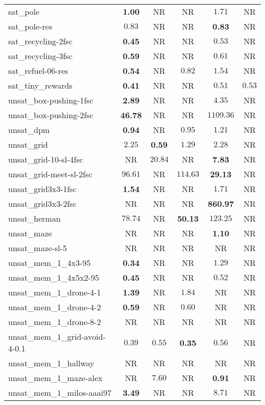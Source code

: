 \begin{tabular}{lccccc}
sat\_pole & \textbf{1.00} & NR & NR & $1.71$ & NR \\
sat\_pole-res & $0.83$ & NR & NR & \textbf{0.83} & NR \\
sat\_recycling-2fsc & \textbf{0.45} & NR & NR & $0.53$ & NR \\
sat\_recycling-3fsc & \textbf{0.59} & NR & NR & $0.61$ & NR \\
sat\_refuel-06-res & \textbf{0.54} & NR & $0.82$ & $1.54$ & NR \\
sat\_tiny\_rewards & \textbf{0.41} & NR & NR & $0.51$ & $0.53$ \\
unsat\_box-pushing-1fsc & \textbf{2.89} & NR & NR & $4.35$ & NR \\
unsat\_box-pushing-2fsc & \textbf{46.78} & NR & NR & $1109.36$ & NR \\
unsat\_dpm & \textbf{0.94} & NR & $0.95$ & $1.21$ & NR \\
unsat\_grid & $2.25$ & \textbf{0.59} & $1.29$ & $2.28$ & NR \\
unsat\_grid-10-sl-4fsc & NR & $20.84$ & NR & \textbf{7.83} & NR \\
unsat\_grid-meet-sl-2fsc & $96.61$ & NR & $114.63$ & \textbf{29.13} & NR \\
unsat\_grid3x3-1fsc & \textbf{1.54} & NR & NR & $1.71$ & NR \\
unsat\_grid3x3-2fsc & NR & NR & NR & \textbf{860.97} & NR \\
unsat\_herman & $78.74$ & NR & \textbf{50.13} & $123.25$ & NR \\
unsat\_maze & NR & NR & NR & \textbf{1.10} & NR \\
unsat\_maze-sl-5 & NR & NR & NR & NR & NR \\
unsat\_mem\_1\_4x3-95 & \textbf{0.34} & NR & NR & $1.29$ & NR \\
unsat\_mem\_1\_4x5x2-95 & \textbf{0.45} & NR & NR & $0.52$ & NR \\
unsat\_mem\_1\_drone-4-1 & \textbf{1.39} & NR & $1.84$ & NR & NR \\
unsat\_mem\_1\_drone-4-2 & \textbf{0.59} & NR & $0.60$ & NR & NR \\
unsat\_mem\_1\_drone-8-2 & NR & NR & NR & NR & NR \\
unsat\_mem\_1\_grid-avoid-4-0.1 & $0.39$ & $0.55$ & \textbf{0.35} & $0.56$ & NR \\
unsat\_mem\_1\_hallway & NR & NR & NR & NR & NR \\
unsat\_mem\_1\_maze-alex & NR & $7.60$ & NR & \textbf{0.91} & NR \\
unsat\_mem\_1\_milos-aaai97 & \textbf{3.49} & NR & NR & $8.71$ & NR \\

\end{tabular}
